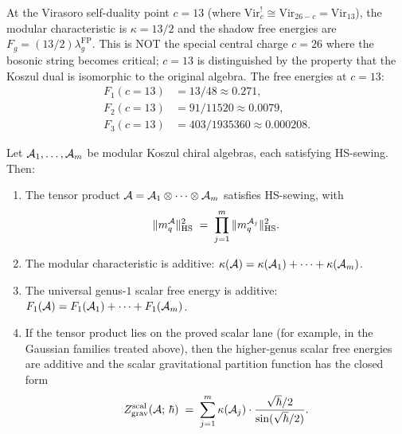 \begin{remark}
\label{rem:thqg-I-virasoro-self-dual}
At the Virasoro self-duality point $c = 13$ (where $\mathrm{Vir}_c^! \cong \mathrm{Vir}_{26-c} = \mathrm{Vir}_{13}$), the modular characteristic is $\kappa = 13/2$ and the shadow free energies are $F_g = (13/2)\lambda_g^{\mathrm{FP}}$. This is NOT the special central charge $c = 26$ where the bosonic string becomes critical; $c = 13$ is distinguished by the property that the Koszul dual is isomorphic to the original algebra. The free energies at $c = 13$:
\begin{align*}
F_1(c=13) &= 13/48 \approx 0.271, \\
F_2(c=13) &= 91/11520 \approx 0.0079, \\
F_3(c=13) &= 403/1935360 \approx 0.000208.
\end{align*}
\end{remark}

\begin{proposition}
\label{prop:thqg-I-tensor-product}
Let $\mathcal{A}_1, \ldots, \mathcal{A}_m$ be modular Koszul chiral algebras, each satisfying HS-sewing. Then:
\begin{enumerate}[label=\textup{(\roman*)}]
\item The tensor product $\mathcal{A} = \mathcal{A}_1 \otimes \cdots \otimes \mathcal{A}_m$ satisfies HS-sewing, with
 \begin{equation}\label{eq:thqg-I-tensor-hs}
 \|m_q^{\mathcal{A}}\|_{\operatorname{HS}}^2 \;=\; \prod_{j=1}^m \|m_q^{\mathcal{A}_j}\|_{\operatorname{HS}}^2.
 \end{equation}
\item The modular characteristic is additive: $\kappa(\mathcal{A}) = \kappa(\mathcal{A}_1) + \cdots + \kappa(\mathcal{A}_m)$.
\item The universal genus-$1$ scalar free energy is additive:
 $F_1(\mathcal{A}) = F_1(\mathcal{A}_1) + \cdots + F_1(\mathcal{A}_m)$.
\item If the tensor product lies on the proved scalar lane
 \textup{(}for example, in the Gaussian families treated above\textup{)},
 then the higher-genus scalar free energies are additive and the
 scalar gravitational partition function has the closed form
 \begin{equation}\label{eq:thqg-I-tensor-partition}
 Z_{\mathrm{grav}}^{\mathrm{scal}}(\mathcal{A};\,\hbar) \;=\; \sum_{j=1}^m \kappa(\mathcal{A}_j) \cdot \frac{\sqrt{\hbar}/2}{\sin(\sqrt{\hbar}/2)}.
 \end{equation}
\end{enumerate}
\end{proposition}

